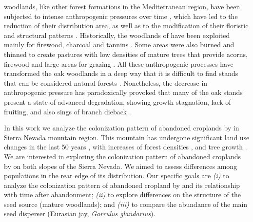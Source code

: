 \Qpw woodlands, like other forest formations in the Mediterranean region, have been subjected to intense anthropogenic pressures over time \autocites{GarciaJimenez20099230Robledales, AlbaSanchezetal2021EarlyAnthropogenic}, which have led to the reduction of their distribution area, as well as to the modification of their floristic and structural patterns \autocites{Gavilanetal2000EffectsDisturbance,Calvoetal1999PostfireSuccession,Tarregaetal2006ForestStructure}. Historically, the woodlands of \Qp have been exploited mainly for firewood, charcoal and tannins \autocites{RuizdelaTorre2006FloraMayor,SanchezPalomaresetal2008EstacionesEcologicas}. Some areas were also burned and thinned to create pastures with low densities of mature trees that provide acorns, firewood and large areas for grazing \autocites{HerreraCalvo2016UsoPastoral,Alvarezetal2009CambiosEstructura,ValbuenaCarabanaGil2017CentenaryCoppicing}. All these anthropogenic processes have transformed the oak woodlands in a deep way that it is difficult to find stands that can be considered natural forests \autocites{RuizdelaTorre2006FloraMayor}. Nonetheless, the decrease in anthropogenic pressure has paradoxically provoked that many of the \Qp oak stands present a state of advanced degradation, showing growth stagnation, lack of fruiting, and also sings of branch dieback  \autocites{Canellasetal2004GrowthResponse, Bravoetal2008SelviculturaMontes, ValbuenaCarabanaGil2014EfectosGestion, PiqueVericat2015EvolutionPerspectives, Piqueetal2018Spain}. 

In this work we analyze the colonization pattern of abandoned croplands by \Qpy in Sierra Nevada mountain region. This mountain has undergone significant land use changes in the last 50 years \autocites{JimenezOlivenciaetal2015EvolucionUsos}, with increases of forest densities \autocite[see chapter \ref{sec:carbon}; also][]{JimenezOlivenciaetal2015MedioSiglo}, and tree growth \autocite[see chapter \ref{sec:dendro};][]{PerezLuqueetal2020LanduseLegacies}. We are interested in exploring the colonization pattern of abandoned croplands by \Qp on both slopes of the Sierra Nevada. We aimed to assess differences among populations in the rear edge of its distribution. Our specific goals are \emph{(i)} to analyze the colonization pattern of abandoned cropland by \Qp and its relationship with time after abandonment; \emph{(ii)} to explore differences on the structure of the seed source (mature woodlands); and \emph{(iii)} to compare the abundance of the main seed disperser (Eurasian jay, \emph{Garrulus glandarius}).

